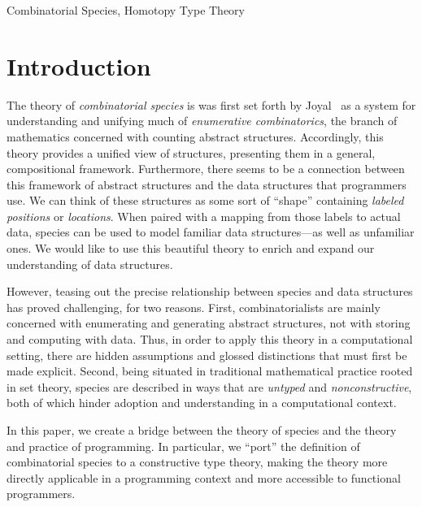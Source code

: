 \documentclass[preprint,authoryear]{sigplanconf}
\theoremstyle{definition}
\theoremstyle{remark}
\begin{document}


\keywords
Combinatorial Species, Homotopy Type Theory

\section{Introduction}
\label{sec:intro}

The theory of \emph{combinatorial species} is was first set forth by
Joyal~\cite{joyal} as a system for understanding and unifying much of
\emph{enumerative combinatorics}, the branch of mathematics concerned
with counting abstract structures. Accordingly, this theory provides a
unified view of structures, presenting them in a general,
compositional framework.  Furthermore, there seems to be a connection
between this framework of abstract structures and the data structures
that programmers use. We can think of these structures as some sort of
``shape'' containing \emph{labeled positions} or
\emph{locations}. When paired with a mapping from those labels to
actual data, species can be used to model familiar data
structures---as well as unfamiliar ones. We would like to use this
beautiful theory to enrich and expand our understanding of data
structures.

However, teasing out the precise relationship between species and data
structures has proved challenging, for two reasons. First, combinatorialists
are mainly concerned with enumerating and generating abstract structures, not
with storing and computing with data.  Thus, in order to apply this theory in
a computational setting, there are hidden assumptions and glossed
distinctions that must first be made explicit.  Second, being situated in
traditional mathematical practice rooted in set theory,
species are described in ways that are \emph{untyped} and
\emph{nonconstructive}, both of which hinder adoption and understanding in a
computational context.

In this paper, we create a bridge between the theory of species and the theory
and practice of programming. In particular, we ``port'' the definition of
combinatorial species to a constructive type theory, making the theory more
directly applicable in a programming context and more accessible to functional
programmers.
\end{document}
